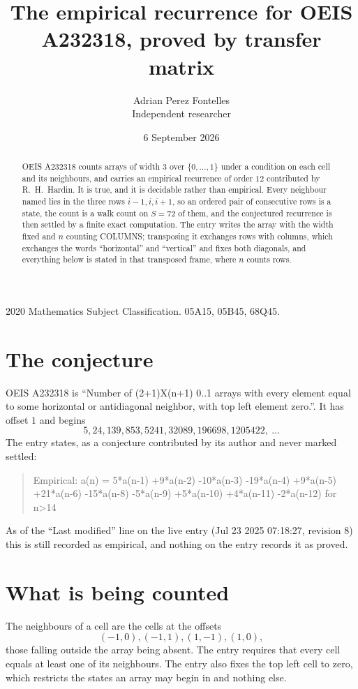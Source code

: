 \documentclass[11pt,a4paper]{article}
\title{The empirical recurrence for OEIS A232318, proved by transfer matrix}
\author{Adrian Perez Fontelles\\ \small Independent researcher}
\date{6 September 2026}
\theoremstyle{plain}
\theoremstyle{definition}
\begin{document}
\maketitle

\begin{abstract}
OEIS A232318 counts arrays of width $3$ over $\{0,\dots,1\}$ under a condition on each cell
and its neighbours, and carries an empirical recurrence of order $12$ contributed by
R.~H.~Hardin. It is true, and it is decidable rather than empirical. Every neighbour named lies
in the three rows $i-1,i,i+1$, so an ordered pair of consecutive rows is a state, the count is
a walk count on $S=72$ of them, and the conjectured recurrence is then settled by a finite
exact computation. The entry writes the array with the width fixed and $n$ counting
COLUMNS; transposing it exchanges rows with columns, which exchanges the words ``horizontal''
and ``vertical'' and fixes both diagonals, and everything below is stated in that transposed
frame, where $n$ counts rows.
\end{abstract}

\noindent\small 2020 Mathematics Subject Classification. 05A15, 05B45, 68Q45.\normalsize

\section{The conjecture}

OEIS A232318 is ``Number of (2+1)X(n+1) 0..1 arrays with every element equal to some horizontal or antidiagonal neighbor, with top left element zero.''. It has offset $1$ and begins
\[
5, 24, 139, 853, 5241, 32089, 196698, 1205422,\ \dots
\]
The entry states, as a conjecture contributed by its author and never marked settled:
\begin{quote}
Empirical: a(n) = 5*a(n-1) +9*a(n-2) -10*a(n-3) -19*a(n-4) +9*a(n-5) +21*a(n-6) -15*a(n-8) -5*a(n-9) +5*a(n-10) +4*a(n-11) -2*a(n-12) for n>14
\end{quote}
As of the ``Last modified'' line on the live entry (Jul 23 2025 07:18:27, revision 8) this is still
recorded as empirical, and nothing on the entry records it as proved.

\section{What is being counted}

The neighbours of a cell are the cells at the offsets
\[
(-1,0), (-1,1), (1,-1), (1,0),
\]
those falling outside the array being absent. The entry requires that every cell equals at least one of its neighbours. The entry also fixes the top left cell to zero, which restricts the states an array may begin in and nothing else.
\end{document}
